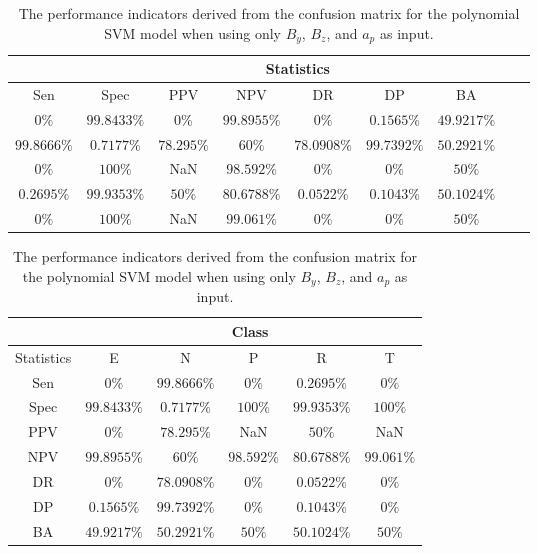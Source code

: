 \begin{table}[!ht]
	\centering
	\begin{tabular}{|c|c|c|c|c|c|c|c|c|}
		\hline
		 & \multicolumn{7}{c|}{Statistics} \\ \hline
		Sen & Spec & PPV & NPV & DR & DP & BA \\ \hline
		$0\%$ & $99.8433\%$ & $0\%$ & $99.8955\%$ & $0\%$ & $0.1565\%$ & $49.9217\%$ \\ \hline
		$99.8666\%$ & $0.7177\%$ & $78.295\%$ & $60\%$ & $78.0908\%$ & $99.7392\%$ & $50.2921\%$ \\ \hline
		$0\%$ & $100\%$ & NaN & $98.592\%$ & $0\%$ & $0\%$ & $50\%$ \\ \hline
		$0.2695\%$ & $99.9353\%$ & $50\%$ & $80.6788\%$ & $0.0522\%$ & $0.1043\%$ & $50.1024\%$ \\ \hline
		$0\%$ & $100\%$ & NaN & $99.061\%$ & $0\%$ & $0\%$ & $50\%$ \\ \hline
	\end{tabular}
	\caption{The performance indicators derived from the confusion matrix for the polynomial SVM model when using only $B_{y}$, $B_{z}$, and $a_{p}$ as input.}
	\label{tab:cs:yzap:svmPoly}
\end{table}

\begin{table}[!ht]
	\centering
	\begin{tabular}{|c|c|c|c|c|c|}
		\hline
		 & \multicolumn{5}{c|}{Class} \\ \hline
		Statistics & E & N & P & R & T \\ \hline
		Sen & $0\%$ & $99.8666\%$ & $0\%$ & $0.2695\%$ & $0\%$ \\ \hline
		Spec & $99.8433\%$ & $0.7177\%$ & $100\%$ & $99.9353\%$ & $100\%$ \\ \hline
		PPV & $0\%$ & $78.295\%$ & NaN & $50\%$ & NaN \\ \hline
		NPV & $99.8955\%$ & $60\%$ & $98.592\%$ & $80.6788\%$ & $99.061\%$ \\ \hline
		DR & $0\%$ & $78.0908\%$ & $0\%$ & $0.0522\%$ & $0\%$ \\ \hline
		DP & $0.1565\%$ & $99.7392\%$ & $0\%$ & $0.1043\%$ & $0\%$ \\ \hline
		BA & $49.9217\%$ & $50.2921\%$ & $50\%$ & $50.1024\%$ & $50\%$ \\ \hline
	\end{tabular}
	\caption{The performance indicators derived from the confusion matrix for the polynomial SVM model when using only $B_{y}$, $B_{z}$, and $a_{p}$ as input.}
	\label{tab:cs:reverse:yzap:svmPoly}
\end{table}
